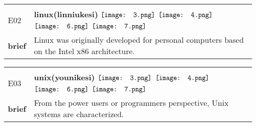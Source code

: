 \documentclass[UTF8]{article}
\begin{document}
            \begin{tabularx}{\textwidth}{p{1.5cm}X}
            \arrayrulecolor{myBlue}
        	\hline\\
            \small{E02}&
            \large{\bfseries{linux(linniukesi)}}\hfill
                                                            \phantom{$\vcenter{\hbox{\texttt{[image: 1.png]}}}$}
                                                                \phantom{$\vcenter{\hbox{\texttt{[image: 2.png]}}}$}
                                                                $\vcenter{\hbox{\texttt{[image: 3.png]}}}$
                                                                $\vcenter{\hbox{\texttt{[image: 4.png]}}}$
                                                                \phantom{$\vcenter{\hbox{\texttt{[image: 5.png]}}}$}
                                                                $\vcenter{\hbox{\texttt{[image: 6.png]}}}$
                                                                $\vcenter{\hbox{\texttt{[image: 7.png]}}}$
                                        \\[10pt]
            \large{\bfseries{brief}}&\noindent\parbox[c]{\hsize}{Linux was originally developed for personal computers based on the Intel x86 architecture.} \\[5pt]
            \hline\\[-10pt]
        \end{tabularx}
            \begin{tabularx}{\textwidth}{p{1.5cm}X}
            \arrayrulecolor{myBlue}
        	\hline\\
            \small{E03}&
            \large{\bfseries{unix(younikesi)}}\hfill
                                                            \phantom{$\vcenter{\hbox{\texttt{[image: 1.png]}}}$}
                                                                \phantom{$\vcenter{\hbox{\texttt{[image: 2.png]}}}$}
                                                                $\vcenter{\hbox{\texttt{[image: 3.png]}}}$
                                                                $\vcenter{\hbox{\texttt{[image: 4.png]}}}$
                                                                \phantom{$\vcenter{\hbox{\texttt{[image: 5.png]}}}$}
                                                                $\vcenter{\hbox{\texttt{[image: 6.png]}}}$
                                                                $\vcenter{\hbox{\texttt{[image: 7.png]}}}$
                                        \\[10pt]
            \large{\bfseries{brief}}&\noindent\parbox[c]{\hsize}{From the power users or programmers perspective, Unix systems are characterized.} \\[5pt]
            \hline\\[-10pt]
        \end{tabularx}
\end{document}
